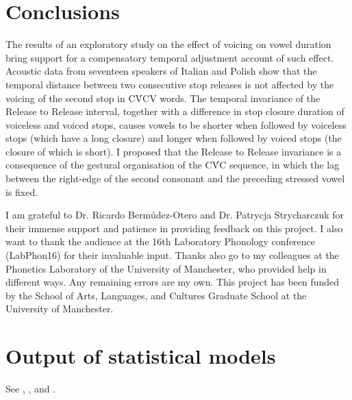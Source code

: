\documentclass[preprint]{JASAnew}
\begin{document}
\section{Conclusions}\label{conclusions}

The results of an exploratory study on the effect of voicing on vowel
duration bring support for a compensatory temporal adjustment account of
such effect. Acoustic data from seventeen speakers of Italian and Polish
show that the temporal distance between two consecutive stop releases is
not affected by the voicing of the second stop in CV́CV words. The
temporal invariance of the Release to Release interval, together with a
difference in stop closure duration of voiceless and voiced stops,
causes vowels to be shorter when followed by voiceless stops (which have
a long closure) and longer when followed by voiced stops (the closure of
which is short). I proposed that the Release to Release invariance is a
consequence of the gestural organisation of the CV́C sequence, in which
the lag between the right-edge of the second consonant and the preceding
stressed vowel is fixed.

\begin{acknowledgments}
I am grateful to Dr. Ricardo Bermúdez-Otero and Dr. Patrycja Strycharczuk for their immense support and patience in providing feedback on this project.
I also want to thank the audience at the 16th Laboratory Phonology conference (LabPhon16) for their invaluable input.
Thanks also go to my colleagues at the Phonetics Laboratory of the University of Manchester, who provided help in different ways.
Any remaining errors are my own.
This project has been funded by the School of Arts, Languages, and Cultures Graduate School at the University of Manchester.
\end{acknowledgments}

\appendix

\section{Output of statistical
models}\label{output-of-statistical-models}

\label{a:stats}

See , , and
.
\end{document}
